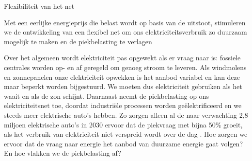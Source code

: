 \begin{voorstel}{Flexibiliteit van het net}

\begin{samenvatting}
Met een eerlijke energieprijs die belast wordt op basis van de uitstoot, stimuleren we de ontwikkeling van een flexibel net om ons elektriciteitsverbruik zo duurzaam mogelijk te maken en de piekbelasting te verlagen
\end{samenvatting}

\begin{multicols*}{2}
\raggedcolumns

\begin{uitdaging}
Over het algemeen wordt elektriciteit pas opgewekt als er vraag naar is: fossiele centrales worden op- en af geregeld om genoeg stroom te leveren. Als windmolens en zonnepanelen onze elektriciteit opwekken is het aanbod variabel en kan deze maar beperkt worden bijgestuurd. We moeten dus elektriciteit gebruiken als het waait en als de zon schijnt. Daarnaast neemt de piekbelasting op ons elektriciteitsnet toe, doordat industriële processen worden geëlektrificeerd en we steeds meer elektrische auto’s hebben. Zo zorgen alleen al de naar verwachting 2,8 miljoen elektrische auto’s in 2030 ervoor dat de piekvraag met bijna 50\% groeit, als het verbruik van elektriciteit niet verspreid wordt over de dag \parencite{enpuls_slim_2019}. Hoe zorgen we ervoor dat de vraag naar energie het aanbod van duurzame energie gaat volgen? En hoe vlakken we de piekbelasting af?
\end{uitdaging}

\begin{overwegingen}


\end{overwegingen}
\end{multicols*}
\end{voorstel}
